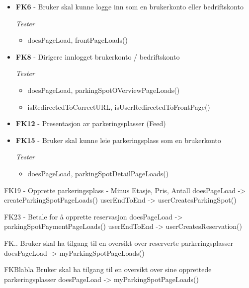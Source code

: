 \documentclass[12pt]{article}
\begin{document}
    \begin{itemize}
        \item \textbf{FK6} - Bruker skal kunne logge inn som en brukerkonto eller bedriftskonto
        
        \textit{Tester}
            \begin{itemize}
                \item doesPageLoad, frontPageLoads()
            \end{itemize}

        \item \textbf{FK8} - Dirigere innlogget brukerkonto / bedriftskonto
        
        \textit{Tester}
            \begin{itemize}
                \item doesPageLoad, parkingSpotOVerviewPageLoads()
                \item isRedirectedToCorrectURL, isUserRedirectedToFrontPage()
            \end{itemize}
        
        \item \textbf{FK12} - Presentasjon av parkeringsplasser (Feed)

        \item \textbf{FK15} - Bruker skal kunne leie parkeringsplass som en brukerkonto 
        
        \textit{Tester}
            \begin{itemize}
                \item doesPageLoad, parkingSpotDetailPageLoads()
            \end{itemize}
    \end{itemize}
    
    FK19 - Opprette parkeringsplass
            - Minus Etasje, Pris, Antall
        doesPageLoad
        -> createParkingSpotPageLoads()
        userEndToEnd
        -> userCreatesParkingSpot()

    FK23 - Betale for å opprette reservasjon
        doesPageLoad
        -> parkingSpotPaymentPageLoads()
        userEndToEnd
        -> userCreatesReservation()

    FK.. Bruker skal ha tilgang til en oversikt over reserverte parkeringsplasser
        doesPageLoad
        -> myParkingSpotPageLoads()

    FKBlabla Bruker skal ha tilgang til en oversikt over sine 
        opprettede parkeringsplasser
        doesPageLoad
        -> myParkingSpotPageLoads()
\end{document}
